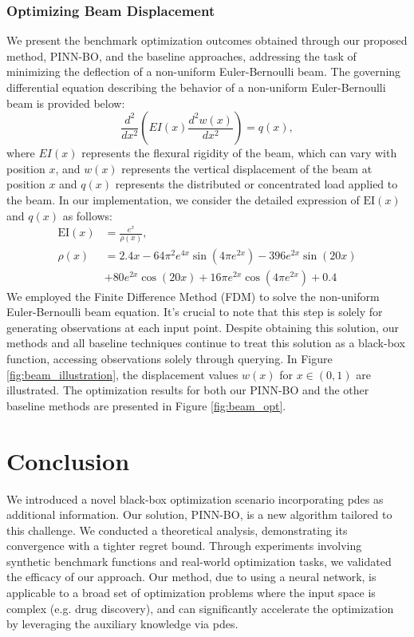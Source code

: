 \subsubsection{Optimizing Beam Displacement}
We present the benchmark optimization outcomes obtained through our proposed method, PINN-BO, and the baseline approaches, addressing the task of minimizing the deflection of a non-uniform Euler-Bernoulli beam. The governing differential equation describing the behavior of a non-uniform Euler-Bernoulli beam is provided below: 
\begin{equation*}
    \frac{d^2}{dx^2} \left( EI(x) \frac{d^2 w(x)}{dx^2} \right) = q(x),
\end{equation*}
where
$EI(x)$ represents the flexural rigidity of the beam, which can vary with position $x$, and $w(x)$ represents the vertical displacement of the beam at position $x$ and 
$q(x)$ represents the distributed or concentrated load applied to the beam. 
In our implementation, we consider the detailed expression of $\text{EI}(x)$ and $q(x)$ as follows:
\begin{align*}
    \text{EI}(x) &= \frac{e^x}{\rho(x)},\\
    \rho(x) &= 2.4 x - 64 \pi^{2} e^{4 x} \sin{\left(4 \pi e^{2 x} \right)} - 396 e^{2 x} \sin{\left(20 x \right)} \\
    &+ 80 e^{2 x} \cos{\left(20 x \right)} + 16 \pi e^{2 x} \cos{\left(4 \pi e^{2 x} \right)} + 0.4
\end{align*}
We employed the Finite Difference Method (FDM) to solve the non-uniform Euler-Bernoulli beam equation. It's crucial to note that this step is solely for generating observations at each input point. Despite obtaining this solution, our methods and all baseline techniques continue to treat this solution as a black-box function, accessing observations solely through querying. In Figure \ref{fig:beam_illustration}, the displacement values $w(x)$ for $x \in (0,1)$ are illustrated. The optimization results for both our PINN-BO and the other baseline methods are presented in Figure \ref{fig:beam_opt}.

\section{Conclusion}
We introduced a novel black-box optimization scenario incorporating \aclp{pde} as additional information. Our solution, PINN-BO, is a new algorithm tailored to this challenge. We conducted a theoretical analysis, demonstrating its convergence with a tighter regret bound. Through experiments involving synthetic benchmark functions and real-world optimization tasks, we validated the efficacy of our approach. Our method, due to using a neural network, is applicable to a broad set of optimization problems where the input space is complex (e.g. drug discovery), and can significantly accelerate the optimization by leveraging the auxiliary knowledge via \acp{pde}.

